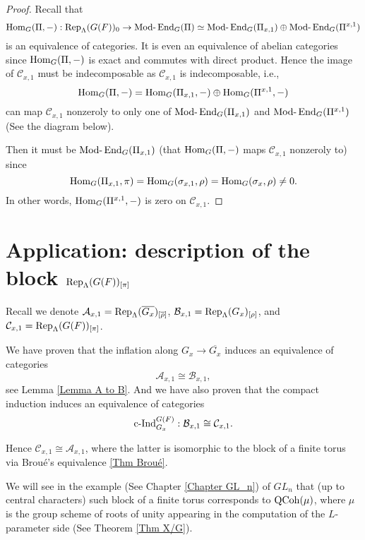 	\begin{proof}
		Recall that 
		$$\operatorname{\operatorname{Hom}}_G(\Pi, -): \operatorname{\operatorname{Rep}}_{\Lambda}(G(F))_0 \to \operatorname{Mod-}\operatorname{\operatorname{End}}_G(\Pi) \simeq \operatorname{Mod-}\operatorname{\operatorname{End}}_G(\Pi_{x,1}) \oplus \operatorname{Mod-}\operatorname{\operatorname{End}}_G(\Pi^{x,1})$$ 
		is an equivalence of categories. It is even an equivalence of abelian categories since $\operatorname{\operatorname{Hom}}_G(\Pi, -)$ is exact and commutes with direct product. Hence the image of $\mathcal{C}_{x,1}$ must be indecomposable as $\mathcal{C}_{x,1}$ is indecomposable, i.e., 
		$$\operatorname{\operatorname{Hom}}_G(\Pi, -)=\operatorname{\operatorname{Hom}}_G(\Pi_{x,1}, -) \oplus \operatorname{\operatorname{Hom}}_G(\Pi^{x,1}, -)$$
		can map $\mathcal{C}_{x,1}$ nonzeroly to only one of $\operatorname{Mod-}\operatorname{\operatorname{End}}_G(\Pi_{x,1})$ and $\operatorname{Mod-}\operatorname{\operatorname{End}}_G(\Pi^{x,1})$ (See the diagram below). 
		
		
		Then it must be $\operatorname{Mod-}\operatorname{\operatorname{End}}_G(\Pi_{x,1})$ (that $\operatorname{\operatorname{Hom}}_G(\Pi, -)$ maps $\mathcal{C}_{x,1}$ nonzeroly to) since 
		$$\operatorname{\operatorname{Hom}}_G(\Pi_{x,1}, \pi)=\operatorname{\operatorname{Hom}}_G(\sigma_{x,1}, \rho)=\operatorname{\operatorname{Hom}}_G(\sigma_x, \rho) \neq 0.$$
		In other words, $\operatorname{\operatorname{Hom}}_G(\Pi^{x,1}, -)$ is zero on $\mathcal{C}_{x,1}$.
		
	\end{proof}
	
	
	\section{Application: description of the block $\operatorname{\operatorname{Rep}}_{\Lambda}(G(F))_{[\pi]}$}

    Recall we denote $\mathcal{A}_{x,1}=\operatorname{\operatorname{Rep}}_{\Lambda}(\overline{G_x})_{[\overline{\rho}]}$, $\mathcal{B}_{x,1}=\operatorname{\operatorname{Rep}}_{\Lambda}(G_x)_{[\rho]}$, and $\mathcal{C}_{x,1}=\operatorname{\operatorname{Rep}}_{\Lambda}(G(F))_{[\pi]}$.
    
    We have proven that the inflation along $G_x \to \overline{G_x}$ induces an equivalence of categories 
    $$\mathcal{A}_{x,1} \cong \mathcal{B}_{x,1},$$
    see Lemma \ref{Lemma A to B}. And we have also proven that the compact induction induces an equivalence of categories
    $$\operatorname{\operatorname{c-Ind}}_{G_x}^{G(F)}: \mathcal{B}_{x,1} \cong \mathcal{C}_{x,1}.$$
    
    Hence $\mathcal{C}_{x,1} \cong \mathcal{A}_{x,1}$, where the latter is isomorphic to the block of a finite torus via Broué's equivalence \ref{Thm Broué}.
    
    We will see in the example (See Chapter \ref{Chapter GL_n}) of $GL_n$ that (up to central characters) such block of a finite torus corresponds to $\operatorname{\operatorname{QCoh}}(\mu)$, where $\mu$ is the group scheme of roots of unity appearing in the computation of the $L$-parameter side (See Theorem \ref{Thm X/G}).